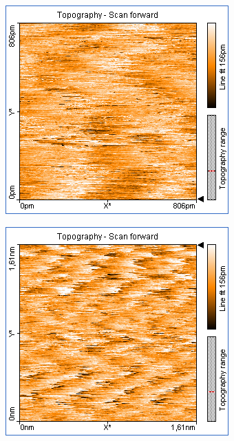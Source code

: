 \begin{figure}
\begin{subfigure}[b]{\picwidth}
        \caption{}
        \label{fig:graphit_06_14}
    \end{subfigure}
    \begin{subfigure}[b]{\picwidth}
        \includegraphics[width=\textwidth]{data/Graphit/pic_06_15_800pm}
        \caption{}
        \label{fig:graphit_06_15}
    \end{subfigure}\qquad
    \begin{subfigure}[b]{\picwidth}
        \includegraphics[width=\textwidth]{data/Graphit/pic_06_16_1600pm}

\end{subfigure}
\end{figure}
